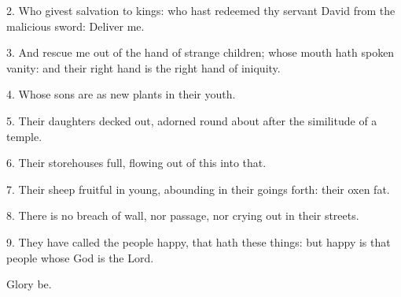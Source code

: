 
2. Who givest salvation to kings: who hast redeemed thy servant David from the malicious sword: Deliver me.

3. And rescue me out of the hand of strange children; whose mouth hath spoken vanity:
and their right hand is the right hand of iniquity.

4. Whose sons are as new plants in their youth.
 
5. Their daughters decked out, adorned round about after the similitude of a temple. 
 
6. Their storehouses full, flowing out of this into that.
 
7. Their sheep fruitful in young, abounding in their goings forth: their oxen fat.
 
8. There is no breach of wall, nor passage, nor crying out in their streets. 
 
9. They have called the people happy, that hath these things: but happy is that people whose God is the Lord. 

Glory be.

